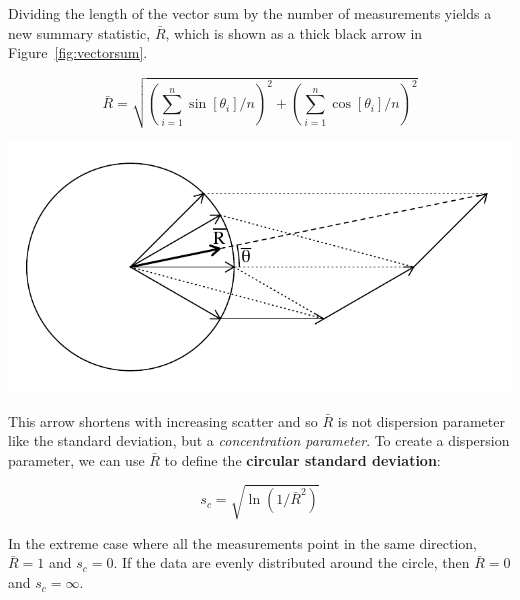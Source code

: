 Dividing the length of the vector sum by the number of measurements
yields a new summary statistic, $\bar{R}$, which is shown as a thick
black arrow in Figure~\ref{fig:vectorsum}.

\begin{equation}
  \bar{R} = \sqrt{\left(\sum_{i=1}^{n} \sin[\theta_i]/n\right)^2 +
    \left( \sum_{i=1}^{n}\cos[\theta_i]/n \right)^2}
  \label{eq:circularR}
\end{equation}

\noindent\begin{minipage}[t][][b]{.45\textwidth}
\includegraphics[width=\textwidth]{../figures/vectorsum.pdf}\\
\end{minipage}
\begin{minipage}[t][][t]{.55\textwidth}
  \label{fig:vectorsum}
\end{minipage}

This arrow shortens with increasing scatter and so $\bar{R}$ is not
dispersion parameter like the standard deviation, but a
\textit{concentration parameter}. To create a dispersion parameter, we
can use $\bar{R}$ to define the \textbf{circular standard deviation}:

\begin{equation}
  s_c = \sqrt{\ln(1/\bar{R}^2)}
  \label{eq:circularSD}
\end{equation}

In the extreme case where all the measurements point in the same
direction, $\bar{R} = 1$ and $s_c = 0$. If the data are evenly
distributed around the circle, then $\bar{R} = 0$ and $s_c = \infty$.

